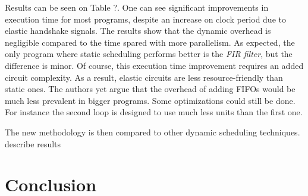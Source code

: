 \documentclass{article}
\def\todo#1{{\color{red}#1}}
\begin{document}
Results can be seen on Table ?. One can see significant improvements in execution time for most programs, despite an increase on clock period due to elastic handshake signals.
The results show that the dynamic overhead is negligible compared to the time spared with more parallelism. As expected, the only program where static scheduling performs better is the \textit{FIR filter}, but the difference is minor.
Of course, this execution time improvement requires an added circuit complexity. As a result, elastic circuits are less resource-friendly than static ones. The authors yet argue that the overhead of adding FIFOs would be much less prevalent in bigger programs. Some optimizations could still be done. For instance the second loop is designed to use much less units than the first one.

The new methodology is then compared to other dynamic scheduling techniques.
\todo{describe results}

\section{Conclusion}
\end{document}
